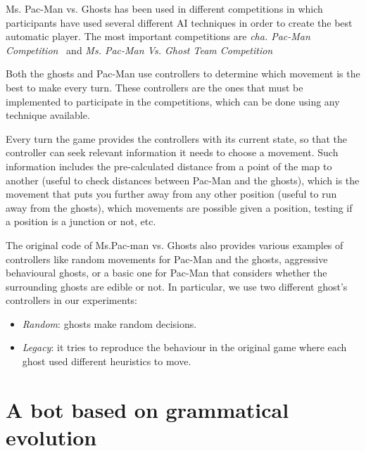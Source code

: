 \documentclass{llncs}
\newcommand{\pacman}{Ms. Pac-Man vs. Ghosts }
\newcommand{\paco}{Pac-Man }
\begin{document}
\pacman has been used in different competitions in which participants have used several different AI techniques in order to create the best automatic player. The most important competitions are \emph{cha. Pac-Man Competition}~\cite{mspacmancompetitionwebsite} and \emph{Ms. Pac-Man Vs. Ghost Team Competition}~\cite{pacmanvsghostsaiwebsite} \cite{pmvsghostspaper2016}

Both the ghosts and \paco use controllers to determine which movement is the best to make every turn. These controllers are the ones that must be implemented to participate in the competitions, which can be done using any technique available.

Every turn the game provides the controllers with its current state, so that the controller can seek relevant information it needs to choose a movement. Such information includes the pre-calculated distance from a point of the map to another (useful to check distances between \paco and the ghosts), which is the movement that puts you further away from any other position (useful to run away from the ghosts), which movements are possible given a position, testing if a position is a junction or not, etc. 


The original code of Ms.Pac-man vs. Ghosts also provides various examples of controllers like random movements for \paco and the ghosts, aggressive behavioural ghosts, or a basic one for \paco that considers whether the surrounding ghosts are edible or not. In particular, we use two different ghost's controllers in our experiments:

\begin{itemize}
\item \emph{Random}: ghosts make random decisions.
\item \emph{Legacy}: it tries to reproduce the behaviour in the original game where each ghost used different heuristics to move.
\end{itemize}


%
\section{A bot based on grammatical evolution}
\label{sec:sec1}
%
\end{document}
